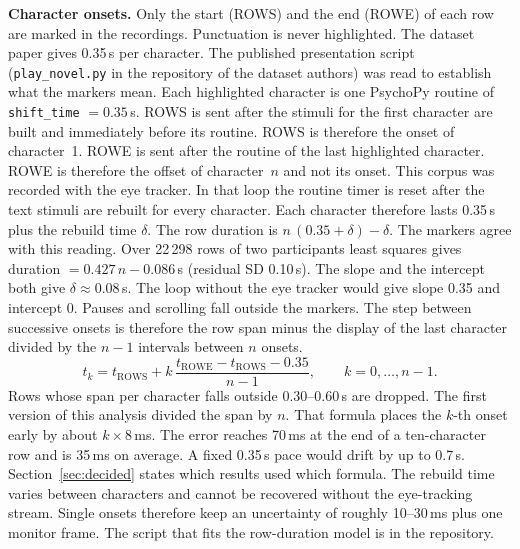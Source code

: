\documentclass[sigconf]{acmart}
\begin{document}
\textbf{Character onsets.} Only the start (ROWS) and the end (ROWE) of each row are marked in the recordings. Punctuation is never highlighted. The dataset paper gives 0.35\,s per character. The published presentation script (\texttt{play\_novel.py} in the repository of the dataset authors) was read to establish what the markers mean. Each highlighted character is one PsychoPy routine of \texttt{shift\_time} $= 0.35$\,s. ROWS is sent after the stimuli for the first character are built and immediately before its routine. ROWS is therefore the onset of character~1. ROWE is sent after the routine of the last highlighted character. ROWE is therefore the offset of character~$n$ and not its onset. This corpus was recorded with the eye tracker. In that loop the routine timer is reset after the text stimuli are rebuilt for every character. Each character therefore lasts 0.35\,s plus the rebuild time $\delta$. The row duration is $n\,(0.35 + \delta) - \delta$. The markers agree with this reading. Over 22\,298 rows of two participants least squares gives duration $= 0.427\,n - 0.086$\,s (residual SD 0.10\,s). The slope and the intercept both give $\delta \approx 0.08$\,s. The loop without the eye tracker would give slope 0.35 and intercept 0. Pauses and scrolling fall outside the markers. The step between successive onsets is therefore the row span minus the display of the last character divided by the $n-1$ intervals between $n$ onsets.
\[
t_k = t_\text{ROWS} + k \, \frac{t_\text{ROWE} - t_\text{ROWS} - 0.35}{n - 1}, \qquad k = 0, \dots, n-1 .
\]
Rows whose span per character falls outside 0.30--0.60\,s are dropped. The first version of this analysis divided the span by $n$. That formula places the $k$-th onset early by about $k \times 8$\,ms. The error reaches 70\,ms at the end of a ten-character row and is 35\,ms on average. A fixed 0.35\,s pace would drift by up to 0.7\,s. Section~\ref{sec:decided} states which results used which formula. The rebuild time varies between characters and cannot be recovered without the eye-tracking stream. Single onsets therefore keep an uncertainty of roughly 10--30\,ms plus one monitor frame. The script that fits the row-duration model is in the repository.
\end{document}
